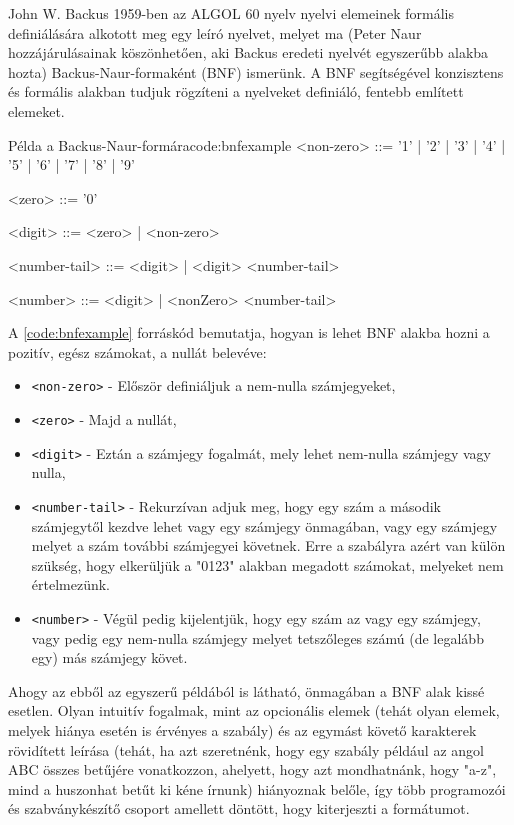 John W. Backus 1959-ben az ALGOL 60 nyelv nyelvi elemeinek formális definiálására alkotott meg egy leíró nyelvet\cite{bnf}, melyet ma (Peter Naur hozzájárulásainak köszönhetően, aki Backus eredeti nyelvét egyszerűbb alakba hozta) Backus-Naur-formaként (BNF) ismerünk. A BNF segítségével konzisztens és formális alakban tudjuk rögzíteni a nyelveket definiáló, fentebb említett elemeket.

\begin{code}{Példa a Backus-Naur-formára}{code:bnfexample}
<non-zero> ::= '1' | '2' | '3' 
            | '4' | '5' | '6' 
            | '7' | '8' | '9'

<zero> ::= '0'

<digit> ::= <zero> | <non-zero>

<number-tail> ::= <digit> | <digit> <number-tail>

<number> ::= <digit> | <nonZero> <number-tail> 
\end{code}

A \ref{code:bnfexample} forráskód bemutatja, hogyan is lehet BNF alakba hozni a pozitív, egész számokat, a nullát belevéve: 

\begin{itemize}
  \item \texttt{<non-zero>} - Először definiáljuk a nem-nulla számjegyeket,
  \item \texttt{<zero>} - Majd a nullát, 
  \item \texttt{<digit>} - Eztán a számjegy fogalmát, mely lehet nem-nulla számjegy vagy nulla,
  \item \texttt{<number-tail>} - Rekurzívan adjuk meg, hogy egy szám a második számjegytől kezdve lehet vagy egy számjegy önmagában, vagy egy számjegy melyet a szám további számjegyei követnek. Erre a szabályra azért van külön szükség, hogy elkerüljük a "0123" alakban megadott számokat, melyeket nem értelmezünk.
  \item \texttt{<number>} - Végül pedig kijelentjük, hogy egy szám az vagy egy számjegy, vagy pedig egy nem-nulla számjegy melyet tetszőleges számú (de legalább egy) más számjegy követ.
\end{itemize}

Ahogy az ebből az egyszerű példából is látható, önmagában a BNF alak kissé esetlen. Olyan intuitív fogalmak, mint az opcionális elemek (tehát olyan elemek, melyek hiánya esetén is érvényes a szabály) és az egymást követő karakterek rövidített leírása (tehát, ha azt szeretnénk, hogy egy szabály például az angol ABC összes betűjére vonatkozzon, ahelyett, hogy azt mondhatnánk, hogy "a-z", mind a huszonhat betűt ki kéne írnunk) hiányoznak belőle, így több programozói és szabványkészítő csoport amellett döntött, hogy kiterjeszti a formátumot.

